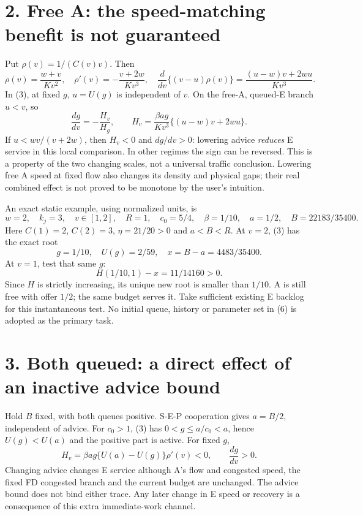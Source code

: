 \documentclass[11pt,a4paper]{article}
\begin{document}
\newpage
\section*{2. Free A: the speed-matching benefit is not guaranteed}
Put $\rho(v)=1/(C(v)v)$. Then
\begin{equation}
\rho(v)=\frac{w+v}{Kv^2},\quad
\rho'(v)=-\frac{v+2w}{Kv^3},\quad
\frac{d}{dv}\{(v-u)\rho(v)\}
=\frac{(u-w)v+2wu}{Kv^3}.\tag{4}
\end{equation}
In (3), at fixed $g$, $u=U(g)$ is independent of $v$. On the free-A,
queued-E branch $u<v$, so
\begin{equation}
\frac{dg}{dv}=-\frac{H_v}{H_g},\qquad
H_v=\frac{\beta a g}{Kv^3}\{(u-w)v+2wu\}.\tag{5}
\end{equation}
If $u<wv/(v+2w)$, then $H_v<0$ and $dg/dv>0$: lowering advice
\emph{reduces} E service in this local comparison. In other regimes the
sign can be reversed. This is a property of the two changing scales, not
a universal traffic conclusion. Lowering free A speed at fixed flow also
changes its density and physical gaps; their real combined effect is not
proved to be monotone by the user's intuition.

An exact static example, using normalized units, is
\begin{equation}
w=2,\quad k_j=3,\quad v\in[1,2],\quad R=1,\quad
c_0=5/4,\quad\beta=1/10,\quad a=1/2,\quad
B=22183/35400.\tag{6}
\end{equation}
Here $C(1)=2$, $C(2)=3$, $\eta=21/20>0$ and $a<B<R$.
At $v=2$, (3) has the exact root
\begin{equation}
g=1/10,\quad U(g)=2/59,\quad x=B-a=4483/35400.\tag{7}
\end{equation}
At $v=1$, test that same $g$:
\begin{equation}
H(1/10,1)-x=11/14160>0.\tag{8}
\end{equation}
Since $H$ is strictly increasing, its unique new root is smaller than
$1/10$. A is still free with offer $1/2$; the same budget serves it.
Take sufficient existing E backlog for this instantaneous test. No initial
queue, history or parameter set in (6) is adopted as the primary task.

\newpage
\section*{3. Both queued: a direct effect of an inactive advice bound}
Hold $B$ fixed, with both queues positive. S-E-P cooperation gives
$a=B/2$, independent of advice. For $c_0>1$, (3) has
$0<g\leq a/c_0<a$, hence $U(g)<U(a)$ and the positive part is active.
For fixed $g$,
\begin{equation}
H_v=\beta a g\{U(a)-U(g)\}\rho'(v)<0,
\qquad \frac{dg}{dv}>0.\tag{9}
\end{equation}
Changing advice changes E service although A's flow and congested speed,
the fixed FD congested branch and the current budget are unchanged. The
advice bound does not bind either trace. Any later change in E speed or
recovery is a consequence of this extra immediate-work channel.
\end{document}
